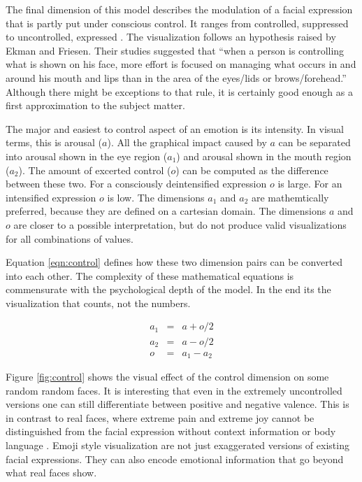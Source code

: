 \documentclass[conference]{IEEEtran}
\begin{document}
The final dimension of this model describes the modulation of a facial expression that is partly put under conscious control.
It ranges from controlled, suppressed 
to uncontrolled, expressed .
The visualization follows an hypothesis raised by Ekman and Friesen\cite{Ekman75}. Their studies suggested that ``when a person is
controlling what is shown on his face, more effort is focused on managing what occurs in and around his mouth and
lips than in the area of the eyes/lids or brows/forehead.''  Although there might be exceptions to that rule,
it is certainly good enough as a first approximation to the subject matter.

The major and easiest to control aspect of an emotion is its intensity. In visual terms, this is arousal ($a$). All
the graphical impact caused by $a$ can be separated into arousal shown in the eye region ($a_1$) and arousal
shown in the mouth region ($a_2$). The amount of excerted control ($o$) can be computed as the difference between
these two. For a consciously deintensified expression $o$ is large. For an intensified expression $o$ is low. The dimensions
$a_1$ and $a_2$ are mathemtically preferred, because they are defined on a cartesian domain. The dimensions $a$ and $o$
are closer to a possible interpretation, but do not produce valid visualizations for all combinations of values.

Equation \eqref{eqn:control} defines how these two dimension pairs can be converted into each other.
The complexity of these mathematical equations is commensurate with the psychological depth of the model.
In the end its the visualization that counts, not the numbers.

\begin{equation}
    \label{eqn:control}
    \begin{array}{rcl}
        a_1 &=& a + o/2 \\
        a_2 &=& a - o/2 \\
        o &=& a_1 - a_2
    \end{array}
\end{equation}

Figure \ref{fig:control} shows the visual effect of the control dimension on some random random faces.
It is interesting that even in the extremely uncontrolled versions one can still differentiate between
positive 
and negative  valence.
This is in contrast to real faces, where extreme pain and extreme joy cannot be distinguished from
the facial expression without context information or body language \cite{painjoy}.
Emoji style visualization are not just exaggerated versions of existing facial expressions.
They can also encode emotional information that go beyond what real faces show.
\end{document}
